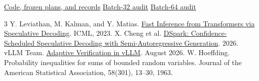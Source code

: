 \documentclass[11pt]{article}
\begin{document}
\small
\noindent\href{https://github.com/angelinaquan/adaptive-verification-for-speculative-decoding}{Code, frozen plans, and records}
\quad\href{https://wandb.ai/aquan-world-model/18657-speculative-pilot/runs/vxw4i4v4}{Batch-32 audit}
\quad\href{https://wandb.ai/aquan-world-model/18657-speculative-pilot/runs/az4k5l1i}{Batch-64 audit}
\footnotesize\begin{thebibliography}{3}\setlength{\itemsep}{0pt}
 Y. Leviathan, M. Kalman, and Y. Matias. \href{https://proceedings.mlr.press/v202/leviathan23a.html}{Fast Inference from Transformers via Speculative Decoding}. ICML, 2023.
 X. Cheng et al. \href{https://arxiv.org/abs/2607.05147}{DSpark: Confidence-Scheduled Speculative Decoding with Semi-Autoregressive Generation}. 2026.
 vLLM Team. \href{https://vllm.ai/blog/2026-08-14-dspark-adaptive-verification}{Adaptive Verification in vLLM}. August 2026.
 W. Hoeffding. Probability inequalities for sums of bounded random variables. Journal of the American Statistical Association, 58(301), 13--30, 1963.
\end{thebibliography}
\end{document}
